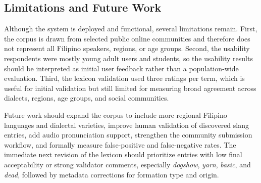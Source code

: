 \subsection{Limitations and Future Work}

Although the system is deployed and functional, several limitations remain. First, the corpus is drawn from selected public online communities and therefore does not represent all Filipino speakers, regions, or age groups. Second, the usability respondents were mostly young adult users and students, so the usability results should be interpreted as initial user feedback rather than a population-wide evaluation. Third, the lexicon validation used three ratings per term, which is useful for initial validation but still limited for measuring broad agreement across dialects, regions, age groups, and social communities.

Future work should expand the corpus to include more regional Filipino languages and dialectal varieties, improve human validation of discovered slang entries, add audio pronunciation support, strengthen the community submission workflow, and formally measure false-positive and false-negative rates. The immediate next revision of the lexicon should prioritize entries with low final acceptability or strong validator comments, especially \textit{dogshow}, \textit{yarn}, \textit{basic}, and \textit{dead}, followed by metadata corrections for formation type and origin.
